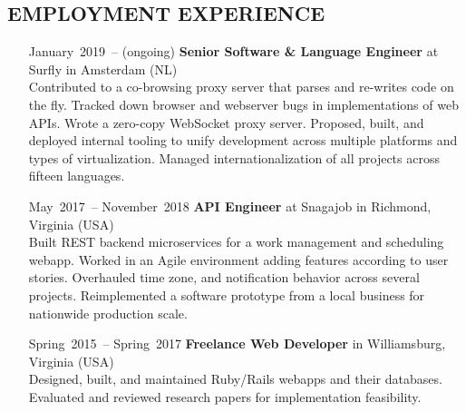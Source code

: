 \documentclass{res}     %
\begin{document}

\begin{resume}

\section{EMPLOYMENT EXPERIENCE}
\vspace{5mm}
\begin{itemize}[font=\itshape,align=parleft,labelwidth=3cm,leftmargin=2cm]
    \item[January~2019~-- (ongoing)]
        \textbf{Senior Software \& Language Engineer}
        at Surfly
        in Amsterdam (NL)
        \vspace{1mm} \\
        Contributed to a co-browsing proxy server that parses and re-writes code on the fly.
        Tracked down browser and webserver bugs in implementations of web APIs.
        Wrote a zero-copy WebSocket proxy server.
        Proposed, built, and deployed internal tooling to unify development across multiple platforms and types of virtualization.
        Managed \mbox{internationalization} of all projects across fifteen languages.
    \item[May~2017~-- November~2018]
        \textbf{API Engineer}
        at Snagajob
        in Richmond, Virginia (USA)
        \vspace{1mm} \\
        Built REST backend microservices for a work management and scheduling webapp.
        Worked in an Agile environment adding features according to user stories.
        Overhauled time zone, and notification behavior across several projects.
        Reimplemented a software prototype from a local business for nationwide production scale.
    \item[Spring~2015~-- Spring~2017]
        \textbf{Freelance Web Developer}
        in Williamsburg, Virginia (USA)
        \vspace{1mm} \\
        Designed, built, and maintained Ruby/Rails webapps and their databases.
        Evaluated and reviewed research papers for implementation feasibility.

\end{itemize}
\end{resume}
\end{document}
